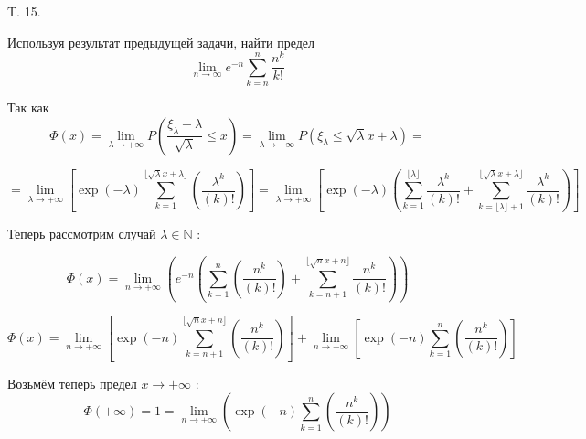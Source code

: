 \documentclass[a4paper,12pt]{article} %
\begin{document}
\begin{example} T. 15. 

Используя результат предыдущей задачи, найти предел
$$
\lim _{n \rightarrow \infty} e^{-n} \sum_{k=n}^{n} \frac{n^{k}}{k !}
$$



Так как
$$
\Phi(x)=\lim _{\lambda \rightarrow+\infty}
P\left(\frac{\xi_{\lambda}-\lambda}{\sqrt{\lambda}} \leq x\right)
=
\lim _{\lambda \rightarrow+\infty}
P\left(\xi_{\lambda} \leq \sqrt{\lambda} x+\lambda\right)=
$$



\[ =\lim _{\lambda \rightarrow+\infty}\left[\exp (-\lambda) \sum_{k=1}^{\lfloor\sqrt{\lambda} x+\lambda\rfloor}\left(\frac{\lambda^{k}}{(k) !}\right)\right]
=
\lim _{\lambda \rightarrow+\infty}
\left[
\exp (-\lambda)\left(
\sum_{k=1}^{\lfloor\lambda\rfloor}
\frac{\lambda^{k}}{(k) !}
+
\sum_{k=\lfloor\lambda\rfloor+1}^{\lfloor\sqrt{\lambda} x+\lambda\rfloor}
\frac{\lambda^{k}}{(k) !}
\right)\right] \]



Теперь рассмотрим случай $\lambda \in \mathbb{N}$ :

$$
\Phi(x)=\lim_{n \rightarrow+\infty}\left(
e^{-n}\left(\sum_{k=1}^{n}\left(\frac{n^{k}}{(k) !}\right)
+
\sum_{k=n+1}^{\lfloor\sqrt{n} x+n\rfloor}\frac{n^{k}}{(k) !}\right)
\right) 
$$


\[ 
\Phi(x)=
\lim _{n \rightarrow+\infty}\left[\exp (-n) \sum_{k=n+1}^{\lfloor\sqrt{n} x+n\rfloor}\left(\frac{n^{k}}{(k) !}\right)\right]
+
\lim _{n \rightarrow+\infty}\left[
\exp (-n) \sum_{k=1}^{n}\left(\frac{n^{k}}{(k) !}\right)
\right] \]



Возьмём теперь предел $x \rightarrow+\infty$ :
$$
\Phi(+\infty)=1=\lim_{n \rightarrow+\infty}\left(\exp (-n) \sum_{k=1}^{n}\left(\frac{n^{k}}{(k) !}\right)\right)
$$









\end{example}
\end{document}
